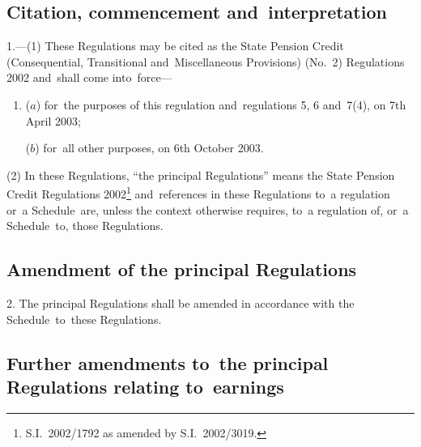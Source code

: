 \documentclass[12pt,a4paper]{article}
\begin{document}
{\sloppy

\tableofcontents

}

\bigskip

\setcounter{secnumdepth}{-2}

\subsection[1. Citation, commencement and~interpretation]{Citation, commencement and~interpretation}

1.---(1)  These Regulations may be cited as the State Pension Credit (Consequential, Transitional and~Miscellaneous Provisions) (No.~2) Regulations 2002 and~shall come into~force—
\begin{enumerate}\item[]
($a$) for~the purposes of this regulation and~regulations 5, 6 and~7(4), on 7th April 2003;

($b$) for~all other purposes, on 6th October 2003.
\end{enumerate}

(2) In these Regulations, “the principal Regulations” means the State Pension Credit Regulations 2002\footnote{S.I.~2002/1792 as amended by S.I.~2002/3019.} and~references in these Regulations to~a regulation or~a Schedule~are, unless the context otherwise requires, to~a regulation of, or~a Schedule~to, those Regulations.

\subsection[2. Amendment of the principal Regulations]{Amendment of the principal Regulations}

2.  The principal Regulations shall be amended in accordance with the Schedule~to~these Regulations.

\subsection[3. Further amendments to~the principal Regulations relating to~earnings]{Further amendments to~the principal Regulations relating to~earnings}
\end{document}
